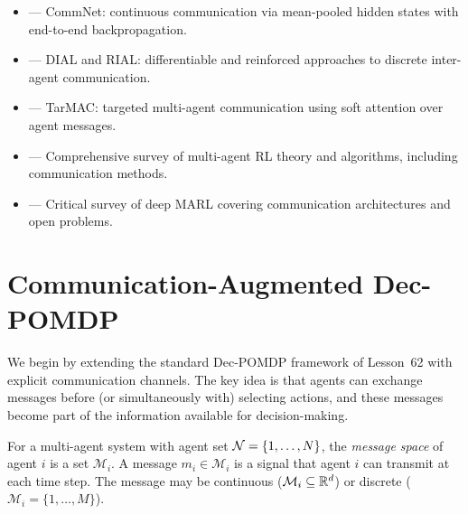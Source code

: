 \documentclass[11pt,a4paper]{article}
\begin{document}
\begin{itemize}
  \item \citet{sukhbaatar2016} --- CommNet: continuous
    communication via mean-pooled hidden states with end-to-end
    backpropagation.
  \item \citet{foerster2016} --- DIAL and RIAL: differentiable
    and reinforced approaches to discrete inter-agent
    communication.
  \item \citet{das2019} --- TarMAC: targeted multi-agent
    communication using soft attention over agent messages.
  \item \citet{zhang2021} --- Comprehensive survey of multi-agent
    RL theory and algorithms, including communication methods.
  \item \citet{hernandezleal2019} --- Critical survey of deep
    MARL covering communication architectures and open problems.
\end{itemize}

\section{Communication-Augmented Dec-POMDP}
\label{sec:comm-dec-pomdp}

We begin by extending the standard Dec-POMDP framework of
Lesson~62 with explicit communication channels.  The key idea
is that agents can exchange messages before (or simultaneously
with) selecting actions, and these messages become part of the
information available for decision-making.

\begin{definition}
\label{def:message-space}
For a multi-agent system with agent set $\mathcal{N} = \{1, \ldots,
N\}$, the \emph{message space} of agent $i$ is a set
$\mathcal{M}_i$.  A message $m_i \in \mathcal{M}_i$ is a signal
that agent $i$ can transmit at each time step.  The message may
be continuous ($\mathcal{M}_i \subseteq \mathbb{R}^d$) or discrete
($\mathcal{M}_i = \{1, \ldots, M\}$).
\end{definition}
\end{document}
